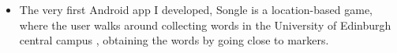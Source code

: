 \documentclass[9pt,a4paper]{altacv}
\begin{document}
\begin{itemize}
\item The very first Android app I developed, Songle is a location-based game, where the user walks around collecting words in the University of Edinburgh central campus , obtaining the words by going close to markers.
\end{itemize}
\end{document}
